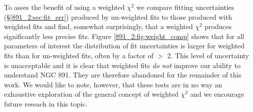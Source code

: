 
To asses the benefit of using a weighted $\chi^2$ we compare fitting
uncertainties (\S\ref{891_2:sec:fit_err}) produced by un-weighted fits to
those produced with weighted fits and find, somewhat surprisingly,
that a weighted $\chi^2$ produces significantly less precise fits.
Figure \ref{891_2:fig:weight_comp} shows that for all parameters of interest
the distribution of fit uncertainties is larger for weighted fits than
for un-weighted fits, often by a factor of $>$ 2. This level of
uncertainty is unacceptable and it is clear that weighted fits
\emph{do not} improve our ability to understand NGC 891. They are
therefore abandoned for the remainder of this work. We would like to
note, however, that these tests are in no way an exhaustive
exploration of the general concept of weighted $\chi^2$ and we
encourage future reseach in this topic.





